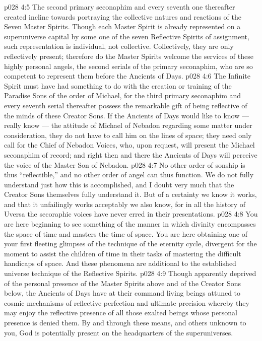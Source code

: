 \vs p028 4:5 \bibnobreakspace {} The second primary seconaphim and every seventh one thereafter created incline towards portraying the collective natures and reactions of the Seven Master Spirits. Though each Master Spirit is already represented on a superuniverse capital by some one of the seven Reflective Spirits of assignment, such representation is individual, not collective. Collectively, they are only reflectively present; therefore do the Master Spirits welcome the services of these highly personal angels, the second serials of the primary seconaphim, who are so competent to represent them before the Ancients of Days.
\vs p028 4:6 \bibnobreakspace {} The Infinite Spirit must have had something to do with the creation or training of the Paradise Sons of the order of Michael, for the third primary seconaphim and every seventh serial thereafter possess the remarkable gift of being reflective of the minds of these Creator Sons. If the Ancients of Days would like to know --- really know --- the attitude of Michael of Nebadon regarding some matter under consideration, they do not have to call him on the lines of space; they need only call for the Chief of Nebadon Voices, who, upon request, will present the Michael seconaphim of record; and right then and there the Ancients of Days will perceive the voice of the Master Son of Nebadon.
\vs p028 4:7 No other order of sonship is thus “reflectible,” and no other order of angel can thus function. We do not fully understand just how this is accomplished, and I doubt very much that the Creator Sons themselves fully understand it. But of a certainty we know it works, and that it unfailingly works acceptably we also know, for in all the history of Uversa the secoraphic voices have never erred in their presentations.
\vs p028 4:8 You are here beginning to see something of the manner in which divinity encompasses the space of time and masters the time of space. You are here obtaining one of your first fleeting glimpses of the technique of the eternity cycle, divergent for the moment to assist the children of time in their tasks of mastering the difficult handicaps of space. And these phenomena are additional to the established universe technique of the Reflective Spirits.
\vs p028 4:9 Though apparently deprived of the personal presence of the Master Spirits above and of the Creator Sons below, the Ancients of Days have at their command living beings attuned to cosmic mechanisms of reflective perfection and ultimate precision whereby they may enjoy the reflective presence of all those exalted beings whose personal presence is denied them. By and through these means, and others unknown to you, God is potentially present on the headquarters of the superuniverses.
